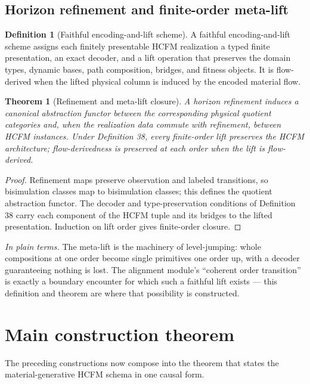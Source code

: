 \documentclass[11pt]{article}
\newtheorem{theorem}{Theorem}
\theoremstyle{definition}
\newtheorem{definition}{Definition}
\newcommand{\plainterms}{\emph{In plain terms.}}
\begin{document}
\subsection{Horizon refinement and finite-order meta-lift}

\begin{definition}[Faithful encoding-and-lift scheme]
A faithful encoding-and-lift scheme assigns each finitely presentable HCFM realization a typed finite presentation, an exact decoder, and a lift operation that preserves the domain types, dynamic bases, path composition, bridges, and fitness objects. It is flow-derived when the lifted physical column is induced by the encoded material flow.
\end{definition}

\begin{theorem}[Refinement and meta-lift closure]
\label{thm:refinement-meta-lift-closure}
A horizon refinement induces a canonical abstraction functor between the corresponding physical quotient categories and, when the realization data commute with refinement, between HCFM instances. Under Definition 38, every finite-order lift preserves the HCFM architecture; flow-derivedness is preserved at each order when the lift is flow-derived.
\end{theorem}

\begin{proof}
Refinement maps preserve observation and labeled transitions, so bisimulation classes map to bisimulation classes; this defines the quotient abstraction functor. The decoder and type-preservation conditions of Definition 38 carry each component of the HCFM tuple and its bridges to the lifted presentation. Induction on lift order gives finite-order closure.
\end{proof}

\noindent\plainterms{} The meta-lift is the machinery of level-jumping: whole compositions at one order become single primitives one order up, with a decoder guaranteeing nothing is lost. The alignment module's ``coherent order transition'' is exactly a boundary encounter for which such a faithful lift exists --- this definition and theorem are where that possibility is constructed.

\section{Main construction theorem}

The preceding constructions now compose into the theorem that states the material-generative HCFM schema in one causal form.
\end{document}
